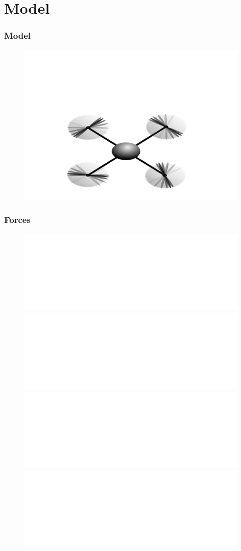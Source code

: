 \section{Model}

\begin{frame}
	\frametitle{Model}
				\begin{figure}[p]
					\centering
					\includegraphics[width=11cm]{images/Copter_leer.pdf}
				\end{figure}
\end{frame}

\begin{frame}
	\frametitle{Forces}
			\begin{figure}[p]
					\centering
					\includegraphics<1>[width=11cm]{images/Copter_Fg.pdf}

					\includegraphics<2>[width=11cm]{images/Copter_Rotorrichtung_zwei.pdf}

					\includegraphics<3>[width=11cm]{images/Copter_Rotorrichtung.pdf}

					\includegraphics<4>[width=11cm]{images/Copter_Rotorkraefte.pdf}
				\end{figure}
\end{frame}

